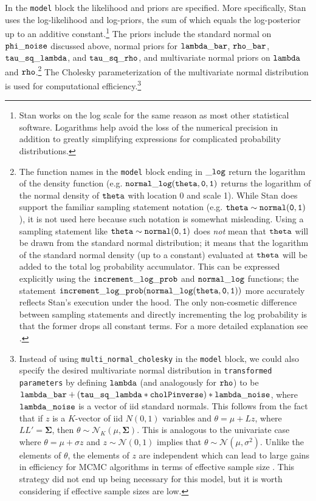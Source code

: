 In the {\tt model} block the likelihood and priors are specified. More specifically, Stan uses the log-likelihood and log-priors, the sum of which equals the log-posterior up to an additive constant.\footnote{Stan works on the log scale for the same reason as most other statistical software. Logarithms help avoid the loss of the numerical precision in addition to greatly simplifying expressions for complicated probability distributions.}
The priors include the standard normal on ${\tt phi\_noise}$ discussed above, normal priors for ${\tt lambda\_bar}$, ${\tt rho\_bar}$, ${\tt tau\_sq\_lambda}$, and ${\tt tau\_sq\_rho}$, and multivariate normal priors on ${\tt lambda}$ and ${\tt rho}$.\footnote{The function names in the {\tt model} block ending in ${\tt\_log}$ return the logarithm of the density function (e.g. ${\tt normal\_log(theta,0,1)}$ returns the logarithm of the normal density of ${\tt theta}$  with location 0 and scale 1). While Stan does support the familiar sampling statement notation (e.g. ${\tt theta \sim normal(0,1)}$), it is not used here because such notation is somewhat misleading. Using a sampling statement like ${\tt theta \sim normal(0,1)}$ does {\it not} mean that ${\tt theta}$ will be drawn from the standard normal distribution; it means that the logarithm of the standard normal density (up to a constant) evaluated at ${\tt theta}$ will be added to the total log probability accumulator. This can be expressed explicitly using the ${\tt increment\_log\_prob}$ and ${\tt normal\_log}$ functions; the statement ${\tt increment\_log\_prob(normal\_log(theta,0,1))}$ more accurately reflects Stan's execution under the hood. The only non-cosmetic difference between sampling statements and directly incrementing the log probability is that the former drops all constant terms. For a more detailed explanation see .} The Cholesky parameterization of the multivariate normal distribution is used for computational efficiency.\footnote{Instead of using {\tt multi\_normal\_cholesky} in the {\tt model} block, we could also specify the desired multivariate normal distribution in {\tt transformed parameters} by defining ${\tt lambda}$ (and analogously for ${\tt rho}$) to be  ${\tt lambda\_bar + (tau\_sq\_lambda * cholPinverse) * lambda\_noise}$, where ${\tt lambda\_noise}$ is a vector of iid standard normals. This follows from the fact that if $z$ is a $K$-vector of iid $N(0,1)$ variables and $\theta = \mu + L z$, where $LL' = \boldsymbol{\Sigma}$, then $\theta \sim \mathcal{N}_K (\mu, \boldsymbol{\Sigma})$. This is analogous to the univariate case where $\theta = \mu + \sigma z$ and $z \sim \mathcal{N}(0,1)$ implies that $\theta \sim \mathcal{N}(\mu, \sigma^2)$. Unlike the elements of $\theta$, the elements of $z$ are independent which can lead to large gains in efficiency for MCMC algorithms in terms of effective sample size . This strategy did not end up being necessary for this model, but it is worth considering if effective sample sizes are low.} 

